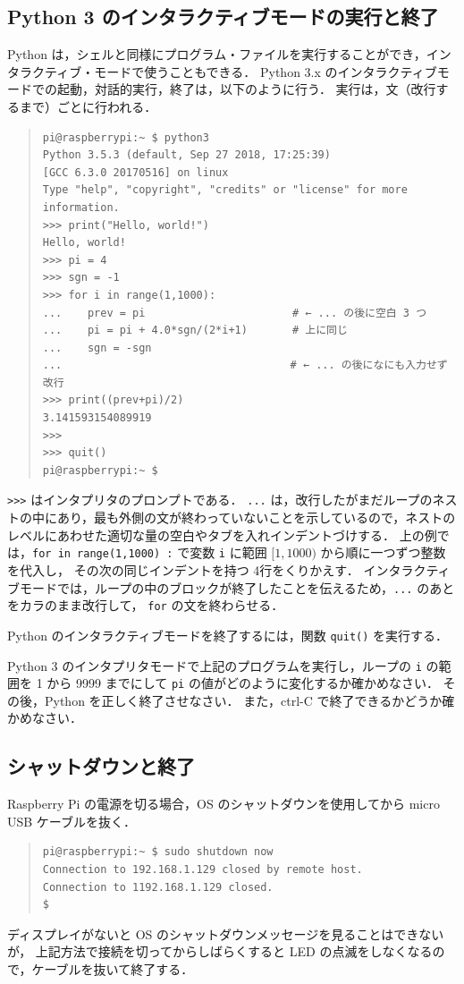 \documentclass[11pt,a4,epsf]{report}
\begin{document}
\subsection{Python 3 のインタラクティブモードの実行と終了}

Python は，シェルと同様にプログラム・ファイルを実行することができ，インタラクティブ・モードで使うこともできる．
Python 3.x のインタラクティブモードでの起動，対話的実行，終了は，以下のように行う．
実行は，文（改行するまで）ごとに行われる．
\begin{quote}
\small
\begin{verbatim}
pi@raspberrypi:~ $ python3
Python 3.5.3 (default, Sep 27 2018, 17:25:39) 
[GCC 6.3.0 20170516] on linux
Type "help", "copyright", "credits" or "license" for more information.
>>> print("Hello, world!")
Hello, world!
>>> pi = 4
>>> sgn = -1
>>> for i in range(1,1000):
...    prev = pi                       # ← ... の後に空白 3 つ
...    pi = pi + 4.0*sgn/(2*i+1)       # 上に同じ
...    sgn = -sgn
... 　                                 # ← ... の後になにも入力せず改行
>>> print((prev+pi)/2)
3.141593154089919
>>> 
>>> quit()
pi@raspberrypi:~ $ 
\end{verbatim}
\end{quote}
\verb+>>>+ はインタプリタのプロンプトである．
\verb+...+ は，改行したがまだループのネストの中にあり，最も外側の文が終わっていないことを示しているので，ネストのレベルにあわせた適切な量の空白やタブを入れインデントづけする．
上の例では，\verb+for in range(1,1000) :+ で変数 \verb+i+ に範囲 $[1,1000)$ から順に一つずつ整数を代入し，
その次の同じインデントを持つ 4行をくりかえす．
インタラクティブモードでは，ループの中のブロックが終了したことを伝えるため，\verb+...+ のあとをカラのまま改行して， \verb+for+ の文を終わらせる．

Python のインタラクティブモードを終了するには，関数 \verb+quit()+ を実行する．

\begin{excercise}
Python 3 のインタプリタモードで上記のプログラムを実行し，ループの \verb+i+ の範囲を 1 から 9999 までにして \verb+pi+ の値がどのように変化するか確かめなさい．
その後，Python を正しく終了させなさい．
また，ctrl-C で終了できるかどうか確かめなさい．
\end{excercise}

\subsection{シャットダウンと終了}

Raspberry Pi の電源を切る場合，OS のシャットダウンを使用してから micro USB ケーブルを抜く．
\begin{quote}
\small
\begin{verbatim}
pi@raspberrypi:~ $ sudo shutdown now
Connection to 192.168.1.129 closed by remote host.
Connection to 1192.168.1.129 closed.
$ 
\end{verbatim}
\end{quote}
ディスプレイがないと OS のシャットダウンメッセージを見ることはできないが，
上記方法で接続を切ってからしばらくすると LED の点滅をしなくなるので，ケーブルを抜いて終了する．
\end{document}
